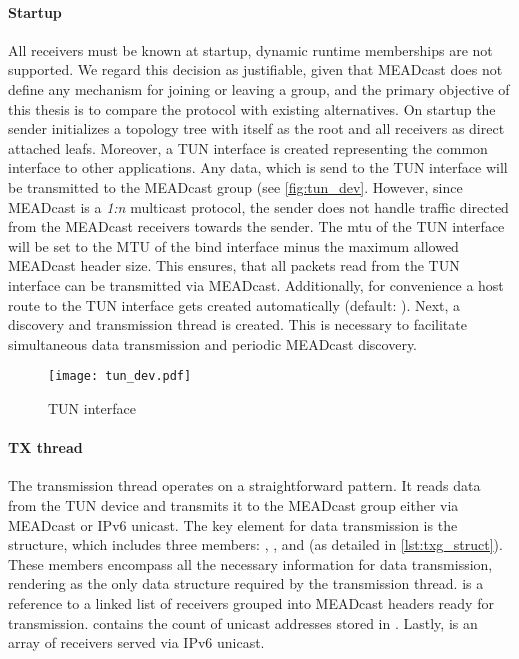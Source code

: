 \paragraph{Startup} %
\label{par:Startup}
All receivers must be known at startup, dynamic runtime memberships are not
    supported.
We regard this decision as justifiable, given that MEADcast does not define any
    mechanism for joining or leaving a group, and the primary objective of this
    thesis is to compare the protocol with existing alternatives.
On startup the sender initializes a topology tree with itself as the root and
    all receivers as direct attached leafs.
Moreover, a TUN interface is created representing the common interface to other
    applications.
Any data, which is send to the TUN interface will be transmitted to the
    MEADcast group (see \autoref{fig:tun_dev}.
However, since MEADcast is a \textit{1:n} multicast protocol, the sender does not
    handle traffic directed from the MEADcast receivers towards the sender.
The \gls{mtu} of the TUN interface will be set to the MTU of the bind interface
    minus the maximum allowed MEADcast header size.
This ensures, that all packets read from the TUN interface can be transmitted
    via MEADcast.
Additionally, for convenience a host route to the TUN interface gets created 
    automatically (default: ).
Next, a discovery and transmission thread is created.
This is necessary to facilitate simultaneous data transmission and periodic
    MEADcast discovery.

\begin{figure}
    \begin{center}
        \texttt{[image: tun\_dev.pdf]}
    \end{center}
    \caption{TUN interface}
    \label{fig:tun_dev}
\end{figure}

\paragraph{TX thread} %
\label{par:TX thread}
The transmission thread operates on a straightforward pattern.
It reads data from the TUN device and transmits it to the MEADcast group either
    via MEADcast or IPv6 unicast.
The key element for data transmission is the  structure,
    which includes three members: , , and
     (as detailed in \autoref{lst:txg_struct}).
These members encompass all the necessary information for data transmission,
    rendering  as the only data structure required by the
    transmission thread.
 is a reference to a linked list of receivers grouped into
    MEADcast headers ready for transmission.
 contains the count of unicast addresses stored in
    .
Lastly,  is an array of receivers served via IPv6 unicast.

